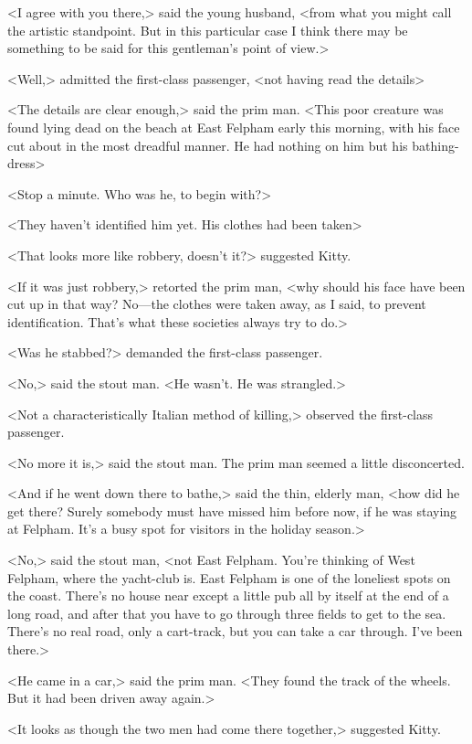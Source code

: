 <I agree with you there,> said the young husband, <from what you might call the artistic standpoint. But in this particular case I think there may be something to be said for this gentleman's point of view.>

<Well,> admitted the first-class passenger, <not having read the details\longdash>

<The details are clear enough,> said the prim man. <This poor creature was found lying dead on the beach at East Felpham early this morning, with his face cut about in the most dreadful manner. He had nothing on him but his bathing-dress\longdash>

<Stop a minute. Who was he, to begin with?>

<They haven't identified him yet. His clothes had been taken\longdash>

<That looks more like robbery, doesn't it?> suggested Kitty.

<If it was just robbery,> retorted the prim man, <why should his face have been cut up in that way? No—the clothes were taken away, as I said, to prevent identification. That's what these societies always try to do.>

<Was he stabbed?> demanded the first-class passenger.

<No,> said the stout man. <He wasn't. He was strangled.>

<Not a characteristically Italian method of killing,> observed the first-class passenger.

<No more it is,> said the stout man. The prim man seemed a little disconcerted.

<And if he went down there to bathe,> said the thin, elderly man, <how did he get there? Surely somebody must have missed him before now, if he was staying at Felpham. It's a busy spot for visitors in the holiday season.>

<No,> said the stout man, <not East Felpham. You're thinking of West Felpham, where the yacht-club is. East Felpham is one of the loneliest spots on the coast. There's no house near except a little pub all by itself at the end of a long road, and after that you have to go through three fields to get to the sea. There's no real road, only a cart-track, but you can take a car through. I've been there.>

<He came in a car,> said the prim man. <They found the track of the wheels. But it had been driven away again.>

<It looks as though the two men had come there together,> suggested Kitty.

